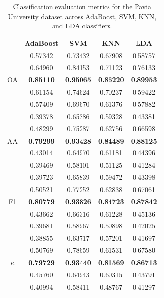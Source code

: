 \documentclass[12pt,onecolumn]{article}
\begin{document}
\begin{table}[h!]
\centering
\begin{tabular}{ccccc}
     \hline
     & AdaBoost & SVM & KNN & LDA \\
     \hline
     \multirow{5}{*}{OA}
     & 0.57342 & 0.73432 & 0.67908 & 0.58757 \\
     & 0.64960 & 0.84153 & 0.71123 & 0.76133 \\
     & \textbf{0.85110} & \textbf{0.95065} & \textbf{0.86220} & \textbf{0.89953} \\
     & 0.61154 & 0.74624 & 0.70237 & 0.59422 \\
     & 0.57409 & 0.69670 & 0.61376 & 0.57882 \\
	 
	 \hline     
	 \multirow{5}{*}{AA}
     & 0.39378 & 0.65386 & 0.59328 & 0.43381 \\
     & 0.48299 & 0.75287 & 0.62756 & 0.66598 \\
     & \textbf{0.79299} & \textbf{0.93428} & \textbf{0.84489} & \textbf{0.88125} \\
     & 0.43014 & 0.64970 & 0.61181 & 0.44396 \\
     & 0.39469 & 0.58101 & 0.51125 & 0.41284 \\
	 
	 \hline
	 \multirow{5}{*}{F1}     
     & 0.39723 & 0.65839 & 0.59472 & 0.43398 \\
     & 0.50521 & 0.77252 & 0.62838 & 0.67061 \\
     & \textbf{0.80779} & \textbf{0.93826} & \textbf{0.84723} & \textbf{0.87842} \\
     & 0.43662 & 0.66316 & 0.61228 & 0.45136 \\
     & 0.39681 & 0.58967 & 0.50898 & 0.42025 \\
	 
	 \hline
	 \multirow{5}{*}{$\kappa$}     
     & 0.38855 & 0.63717 & 0.57201 & 0.41697 \\
     & 0.50769 & 0.78659 & 0.61531 & 0.67580 \\
     & \textbf{0.79729} & \textbf{0.93440} & \textbf{0.81569} & \textbf{0.86713} \\
     & 0.45760 & 0.64943 & 0.60315 & 0.43791 \\
     & 0.40994 & 0.58411 & 0.48767 & 0.41297 \\
     \hline
\end{tabular}
\caption{Classification evaluation metrics for the Pavia University dataset across AdaBoost, SVM, KNN, and LDA classifiers.}
\label{tab:pavia}
\end{table}
\end{document}
